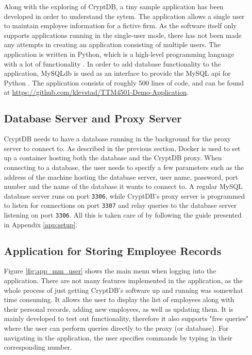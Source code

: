 Along with the exploring of CryptDB, a tiny sample application has been developed in order to understand the sytem. The application allows a single user to maintain employee information for a fictive firm. As the software itself only supports applications running in the single-user mode, there has not been made any attempts in creating an application consisting of multiple users. The application is written in Python, which is a high-level programming language with a lot of functionality \cite{python}. In order to add database functionality to the application, MySQLdb is used as an interface to provide the MySQL \gls{api} for Python \cite{mysqldb}. The application consists of roughly 500 lines of code, and can be found at \url{https://github.com/klevstad/TTM4501-Demo-Application}.

\subsection{Database Server and Proxy Server}

CryptDB needs to have a database running in the background for the proxy server to connect to. As described in the previous section, Docker is used to set up a container hosting both the database and the CryptDB proxy. When connecting to a database, the user needs to specify a few parameters such as the address of the machine hosting the database server, user name, password, port number and the name of the database it wants to connect to. A regular MySQL database server runs on port \verb!3306!, while CryptDB's proxy server is programmed to listen for connections on port \verb!3307! and relay queries to the database server listening on port \verb!3306!. All this is taken care of by following the guide presented in Appendix \ref{app:setup}.

\subsection{Application for Storing Employee Records}

Figure \ref{fig:app_mm_user} shows the main menu when logging into the application. There are not many features implemented in the application, as the whole process of just getting CryptDB's software up and running was somewhat time consuming. It allows the user to display the list of employees along with their personal records, adding new employees, as well as updating them. It is mainly developed to test out functionality, therefore it also supports "free queries" where the user can perform queries directly to the proxy (or database). For navigating in the application, the user specifies commands by typing in their corresponding number.

